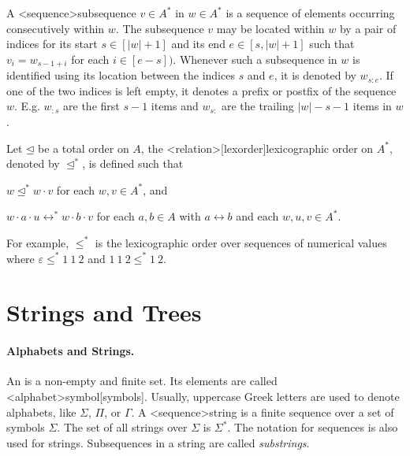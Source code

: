\documentclass[../document.tex]{subfiles}
\begin{document}
    A <sequence>{subsequence} \(v \in A^*\) in \(w\in A^*\) is a sequence of elements occurring consecutively within \(w\).
    The subsequence \(v\) may be located within \(w\) by a pair of indices for its start \(s \in [|w|+1]\) and its end \(e \in [s, |w|+1]\) such that \(v_i = w_{s-1+i}\) for each \(i \in [e-s])\).
    Whenever such a subsequence in \(w\) is identified using its location between the indices \(s\) and \(e\), it is denoted by \(w_{s:e}\).
    If one of the two indices is left empty, it denotes a prefix or postfix of the sequence \(w\).
    E.g. \(w_{:s}\) are the first \(s-1\) items and \(w_{s:}\) are the trailing \(|w|-s-1\) items in \(w\).

    Let \(\unlhd\) be a total order on \(A\), the <relation>[lexorder]{lexicographic order} on \(A^*\), denoted by \(\unlhd^*\), is defined such that
    \begin{compactenum}
        \item \(w \unlhd^* w \cdot v\) for each \(w, v \in A^*\), and
        \item \(w\cdot a\cdot u \rel^* w\cdot b\cdot v \) for each \(a,b \in A\) with \(a \rel b\) and each \(w,u,v \in A^*\).
    \end{compactenum}
    For example, \(\leq^*\) is the lexicographic order over sequences of numerical values where \(\varepsilon \leq^* 1\:1\:2\) and \(1\:1\:2\leq^*1\:2\).


    \section{Strings and Trees}\label{sec:preliminaries:trees}
    \paragraph{Alphabets and Strings.}
    An  is a non-empty and finite set. Its elements are called <alphabet>{symbol}[symbols].
    Usually, uppercase Greek letters are used to denote alphabets, like \(\varSigma\), \(\varPi\), or \(\varGamma\).
    A <sequence>{string} is a finite sequence over a set of symbols \(\varSigma\).
    The set of all strings over \(\varSigma\) is \(\varSigma^*\).
    The notation for sequences is also used for strings.
    Subsequences in a string are called \emph{substrings}.
\end{document}
